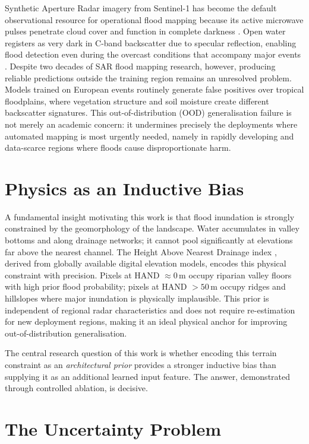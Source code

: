 \documentclass[12pt,oneside]{report}
\begin{document}
Synthetic Aperture Radar imagery from Sentinel-1 has become the default
observational resource for operational flood mapping because its active
microwave pulses penetrate cloud cover and function in complete darkness
\cite{torres2012gmes, moreira2013tutorial}.
Open water registers as very dark in C-band backscatter due to specular
reflection, enabling flood detection even during the overcast conditions that
accompany major events \cite{mason2012near}.
Despite two decades of SAR flood mapping research, however, producing reliable
predictions outside the training region remains an unresolved problem.
Models trained on European events routinely generate false positives over
tropical floodplains, where vegetation structure and soil moisture create
different backscatter signatures.
This out-of-distribution (OOD) generalisation failure is not merely an academic
concern: it undermines precisely the deployments where automated mapping is most
urgently needed, namely in rapidly developing and data-scarce regions where
floods cause disproportionate harm.

\section{Physics as an Inductive Bias}

A fundamental insight motivating this work is that flood inundation is strongly
constrained by the geomorphology of the landscape.
Water accumulates in valley bottoms and along drainage networks; it cannot pool
significantly at elevations far above the nearest channel.
The Height Above Nearest Drainage index \cite{renno2008hand}, derived from
globally available digital elevation models, encodes this physical constraint
with precision.
Pixels at HAND $\approx 0$\,m occupy riparian valley floors with high prior
flood probability; pixels at HAND $> 50$\,m occupy ridges and hillslopes where
major inundation is physically implausible.
This prior is independent of regional radar characteristics and does not require
re-estimation for new deployment regions, making it an ideal physical anchor for
improving out-of-distribution generalisation.

The central research question of this work is whether encoding this terrain
constraint as an \emph{architectural prior} provides a stronger inductive bias
than supplying it as an additional learned input feature.
The answer, demonstrated through controlled ablation, is decisive.

\section{The Uncertainty Problem}
\end{document}
